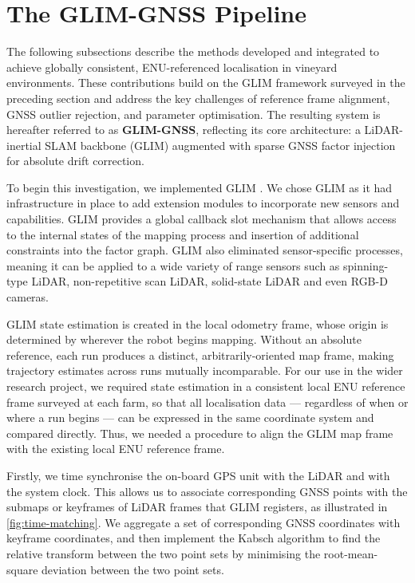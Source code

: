 \section{The GLIM-GNSS Pipeline}
\label{sec:slam-methodology}

The following subsections describe the methods developed and integrated to achieve globally consistent, ENU-referenced localisation in vineyard environments. These contributions build on the GLIM framework surveyed in the preceding section and address the key challenges of reference frame alignment, GNSS outlier rejection, and parameter optimisation. The resulting system is hereafter referred to as \textbf{GLIM-GNSS}, reflecting its core architecture: a LiDAR-inertial SLAM backbone (GLIM) augmented with sparse GNSS factor injection for absolute drift correction.

To begin this investigation, we implemented GLIM \cite{koideGLIM3DRangeInertial2024}. We chose GLIM as it had infrastructure in place to add extension modules to incorporate new sensors and capabilities. GLIM provides a global callback slot mechanism that allows access to the internal states of the mapping process and insertion of additional constraints into the factor graph. GLIM also eliminated sensor-specific processes, meaning it can be applied to a wide variety of range sensors such as spinning-type LiDAR, non-repetitive scan LiDAR, solid-state LiDAR and even RGB-D cameras.

GLIM state estimation is created in the local odometry frame, whose origin is determined by wherever the robot begins mapping. Without an absolute reference, each run produces a distinct, arbitrarily-oriented map frame, making trajectory estimates across runs mutually incomparable. For our use in the wider research project, we required state estimation in a consistent local ENU reference frame surveyed at each farm, so that all localisation data — regardless of when or where a run begins — can be expressed in the same coordinate system and compared directly. Thus, we needed a procedure to align the GLIM map frame with the existing local ENU reference frame.

Firstly, we time synchronise the on-board GPS unit with the LiDAR and with the system clock. This allows us to associate corresponding GNSS points with the submaps or keyframes of LiDAR frames that GLIM registers, as illustrated in \cref{fig:time-matching}. We aggregate a set of corresponding GNSS coordinates with keyframe coordinates, and then implement the Kabsch algorithm \cite{kabschSolutionBestRotation1976} to find the relative transform between the two point sets by minimising the root-mean-square deviation between the two point sets.

